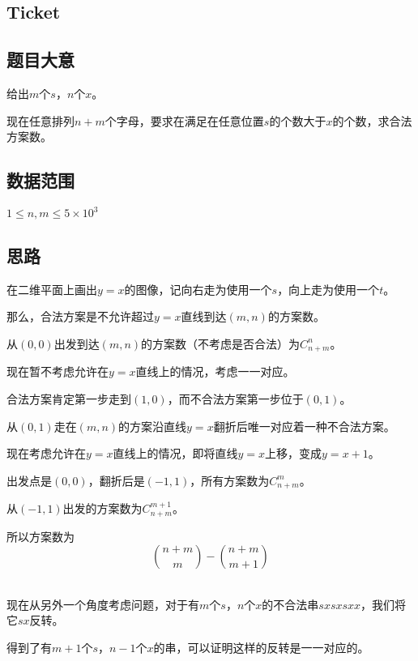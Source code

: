 \documentclass{ctexart}
\numberwithin{equation}{section}
\begin{document}
\begin{flushleft}
  \section{Ticket}
  \subsection{题目大意}
  给出$m$个$s$，$n$个$x$。

  现在任意排列$n+m$个字母，要求在满足在任意位置$s$的个数大于$x$的个数，求合法方案数。
  
  \subsection{数据范围}
  $1\le n,m \le 5\times 10^3$
  \subsection{思路}

  \begin{figure}[htb]
  \end{figure}
  
  在二维平面上画出$y=x$的图像，记向右走为使用一个$s$，向上走为使用一个$t$。

  那么，合法方案是不允许超过$y=x$直线到达$(m,n)$的方案数。

  从$(0,0)$出发到达$(m,n)$的方案数（不考虑是否合法）为$C_{n+m}^n$。

  现在暂不考虑允许在$y=x$直线上的情况，考虑一一对应。

  合法方案肯定第一步走到$(1,0)$，而不合法方案第一步位于$(0,1)$。

  从$(0,1)$走在$(m,n)$的方案沿直线$y=x$翻折后唯一对应着一种不合法方案。

  现在考虑允许在$y=x$直线上的情况，即将直线$y=x$上移，变成$y=x+1$。

  出发点是$(0,0)$，翻折后是$(-1,1)$，所有方案数为$C_{n+m}^m$。

  从$(-1,1)$出发的方案数为$C_{n+m}^{m+1}$。

  所以方案数为$$\binom{n+m}{m}-\binom{n+m}{m+1}$$

  ~\\
  
  现在从另外一个角度考虑问题，对于有$m$个$s$，$n$个$x$的不合法串$sxsxsxx$，我们将它$sx$反转。

  得到了有$m+1$个$s$，$n-1$个$x$的串，可以证明这样的反转是一一对应的。


\end{flushleft}
\end{document}
